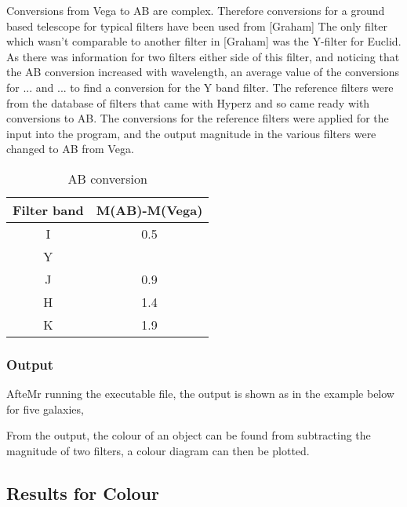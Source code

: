 Conversions from Vega to AB are complex. Therefore conversions for a ground based telescope for typical filters have been used from [Graham] The only filter which wasn't comparable to another filter in [Graham] was the Y-filter for Euclid. As there was information for two filters either side of this filter, and noticing that the AB conversion increased with wavelength, an average value of the conversions for ... and ... to find a conversion for the Y band filter. The reference filters were from the database of filters that came with Hyperz and so came ready with conversions to AB. The conversions for the reference filters were applied for the input into the program, and the output magnitude in the various filters were changed to AB from Vega.

\begin{table}[ht]
			\begin{center}
				\begin{tabular}{c|c}
					Filter band 	& M(AB)-M(Vega) \\
					\hline \hline
					I	& 0.5 \\	 
					Y 	& \\ 
					J 	& 0.9\\
					H 	& 1.4\\
					K 	& 1.9\\
				\end{tabular}
			\end{center}
			\caption{AB conversion}
			\label{tab:AB_conversion}
		\end{table}

	

         \subsubsection {Output}

AfteMr running the executable file, the output is shown as in the example below for five galaxies,


		

From the output, the colour of an object can be found from subtracting the magnitude of two filters, a colour diagram can then be plotted. 




\subsection{Results for Colour} %
	\label{sub:Results_for_Colour}
 
